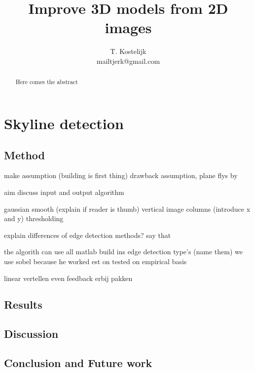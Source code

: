 \documentclass[10pt]{article}
\title{\sc Improve 3D models from 2D images}
\author{T. Kostelijk\\mailtjerk@gmail.com}
\begin{document}
\maketitle

\begin{abstract}
Here comes the abstract
\end{abstract}



\section{Skyline detection}


\subsection{Method} %

make assumption (building is first thing)
drawback assumption, plane flys by

aim
discuss input and output algorithm 

gaussian smooth (explain if reader is thumb)
vertical image columns (introduce x and y) 
thresholding


explain differences of edge detection methods?
say that 

the algorith can use all matlab build ins edge detection type's (name them)
we use sobel because he worked est on tested on empirical basis

linear vertellen
even feedback erbij pakken








\subsection{Results}%
\subsection{Discussion}  %
\subsection{Conclusion and Future work}





\end{document}
